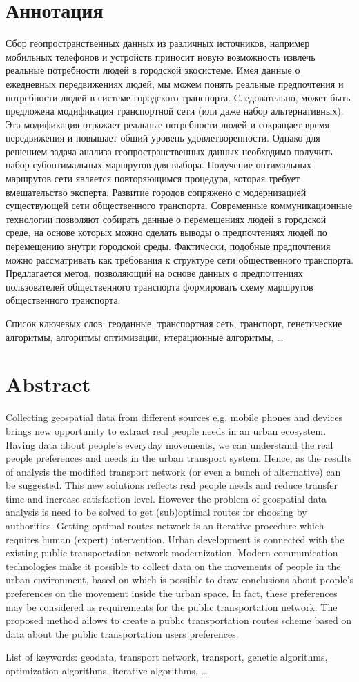\tocless\part{Аннотация}
Сбор геопространственных данных из различных источников, например мобильных телефонов и устройств приносит 
новую возможность извлечь реальные потребности людей в городской экосистеме. Имея данные о ежедневных 
передвижениях людей, мы можем понять реальные предпочтения и потребности людей в системе городского 
транспорта. Следовательно, может быть предложена модификация транспортной сети (или даже набор 
альтернативных). Эта модификация отражает реальные потребности людей и сокращает время передвижения и 
повышает общий уровень удовлетворенности. Однако для решением задача анализа геопространственных данных 
необходимо получить набор субоптимальных маршрутов для выбора. Получение оптимальных маршрутов сети 
является повторяющимся процедура, которая требует вмешательство эксперта.
Развитие городов сопряжено с модернизацией существующей сети общественного транспорта. Современные 
коммуникационные технологии позволяют собирать данные о перемещениях людей в городской среде, на основе 
которых можно сделать выводы о предпочтениях людей по перемещению внутри городской среды. Фактически, 
подобные предпочтения можно рассматривать как требования к структуре сети общественного транспорта. 
Предлагается метод, позволяющий на основе данных о предпочтениях пользователей общественного транспорта 
формировать схему маршрутов общественного транспорта.

Список ключевых слов: геоданные, транспортная сеть, транспорт, генетические алгоритмы, 
алгоритмы оптимизации, итерационные алгоритмы, \ldots

\tocless\part{Abstract}
Collecting geospatial data from different sources e.g. mobile phones and devices brings new opportunity to 
extract real people needs in an urban ecosystem. Having data about people's everyday movements, we can 
understand the real people preferences and needs in the urban transport system. Hence, as the results of 
analysis the modified transport network (or even a bunch of alternative) can be suggested. This new 
solutions reflects real people needs and reduce transfer time and increase satisfaction level. However the 
problem of geospatial data analysis is need to be solved to get (sub)optimal routes for choosing by 
authorities. Getting optimal routes network is an iterative procedure which requires human (expert) 
intervention.
Urban development is connected with the existing public transportation network modernization. Modern 
communication technologies make it possible to collect data on the movements of people in the urban 
environment, based on which is possible to draw conclusions about people's preferences on the movement 
inside the urban space. In fact, these preferences may be considered as requirements for the public 
transportation network. The proposed method allows to create a public transportation routes scheme based 
on data about the public transportation users preferences.

List of keywords: geodata, transport network, transport, genetic algorithms, optimization algorithms,
iterative algorithms, \ldots